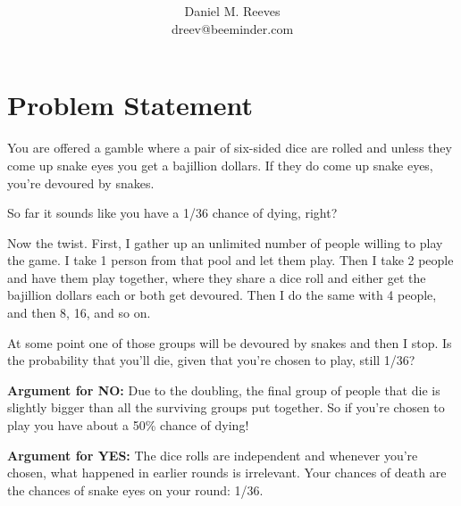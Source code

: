 \documentclass[article,twocolumn]{memoir}
\title{\HUGE\textbf{\longtitle}}
\author{Daniel M. Reeves\\dreev@beeminder.com}
\date{\protect\tstamp} %
\begin{document}
\pagestyle{headings}
\maketitle




\chapter*{Problem Statement}

You are offered a gamble where a pair of six-sided dice are rolled and unless they come up snake eyes you get a bajillion dollars. 
If they do come up snake eyes, you're devoured by snakes.

So far it sounds like you have a 1/36 chance of dying, right?

Now the twist. 
First, I gather up an unlimited number of people willing to play the game. 
I take 1 person from that pool and let them play. 
Then I take 2 people and have them play together, where they share a dice roll and either get the bajillion dollars each or both get devoured. 
Then I do the same with 4 people, and then 8, 16, and so on.

At some point one of those groups will be devoured by snakes and then I stop.
Is the probability that you'll die, given that you're chosen to play, still 1/36?

\vfill

\textbf{Argument for NO:}
Due to the doubling, the final group of people that die is slightly bigger than all the surviving groups put together. 
So if you're chosen to play you have about a 50\% chance of dying!

\vspace{1em}

\textbf{Argument for YES:}
The dice rolls are independent and whenever you're chosen, what happened in earlier rounds is irrelevant.
Your chances of death are the chances of snake eyes on your round: 1/36.
\end{document}
